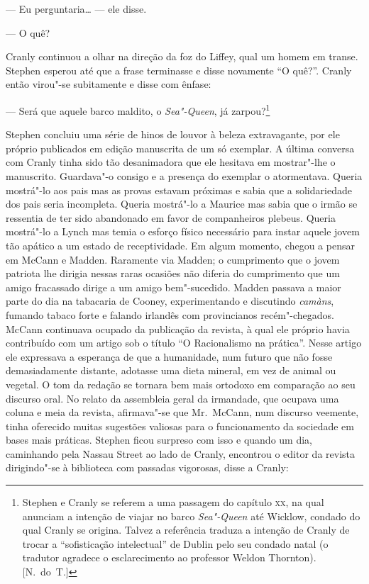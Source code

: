 --- Eu perguntaria\ldots{} --- ele disse.

--- O quê?

Cranly continuou a olhar na direção da foz do Liffey, qual um homem
em transe.  Stephen esperou até que a frase terminasse e disse
novamente “O quê?”.  Cranly então virou"-se subitamente e disse com
ênfase:

--- \label{sera"-que} Será que aquele barco maldito, o \textit{Sea"-Queen}, já
zarpou?\footnote{ Stephen e Cranly se referem a uma passagem do
capítulo \textsc{xx}, na qual anunciam a intenção de viajar no barco
\textit{Sea"-Queen} até Wicklow, condado do qual Cranly se origina.
Talvez a referência traduza a intenção de Cranly de trocar a
“sofisticação intelectual” de Dublin pelo seu condado natal (o tradutor
agradece o esclarecimento ao professor Weldon Thornton). [N.~do~T.]} 

Stephen concluiu uma série de hinos de louvor à beleza extravagante,
por ele próprio publicados em edição manuscrita de um só exemplar.  A
última conversa com Cranly tinha sido tão desanimadora que ele hesitava
em mostrar"-lhe o manuscrito.  Guardava"-o consigo e a
presença do exemplar o atormentava.  Queria mostrá"-lo aos pais mas as
provas estavam próximas e sabia que a solidariedade dos pais seria
incompleta.  Queria mostrá"-lo a Maurice mas sabia que o irmão se
ressentia de ter sido abandonado em favor de companheiros plebeus. 
Queria mostrá"-lo a Lynch mas temia o esforço físico necessário para
instar aquele jovem tão apático a um estado de receptividade.  Em algum
momento, chegou a pensar em McCann e Madden.  Raramente via Madden; o
cumprimento que o jovem patriota lhe dirigia nessas raras ocasiões não
diferia do cumprimento que um amigo fracassado dirige a um amigo
bem"-sucedido.  Madden passava a maior parte do dia na tabacaria de
Cooney, experimentando e discutindo \textit{camàns}, fumando tabaco
forte e falando irlandês com provincianos recém"-chegados.  McCann
continuava ocupado da publicação da revista, à qual ele próprio havia
contribuído com um artigo sob o título “O Racionalismo na prática”. 
Nesse artigo ele expressava a esperança de que a humanidade, num futuro
que não fosse demasiadamente distante, adotasse uma dieta mineral, em
vez de animal ou vegetal.  O tom da redação se tornara bem mais
ortodoxo em comparação ao seu discurso oral.  No relato da assembleia
geral da irmandade, que ocupava uma coluna e meia da revista,
afirmava"-se que Mr.~McCann, num discurso veemente, tinha
oferecido muitas sugestões valiosas para o funcionamento da sociedade
em bases mais práticas.  Stephen ficou surpreso com isso e quando um
dia, caminhando pela Nassau Street ao lado de Cranly, encontrou o
editor da revista dirigindo"-se à biblioteca com passadas vigorosas,
disse a Cranly:

